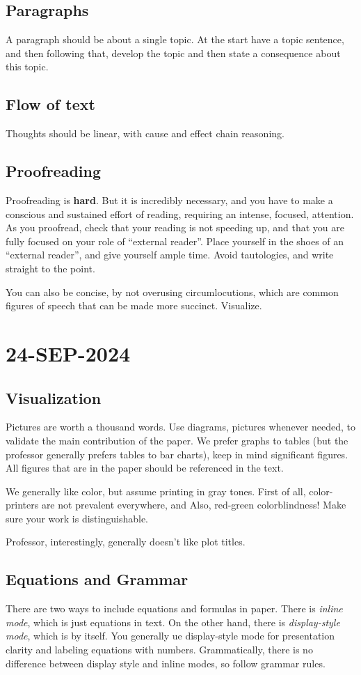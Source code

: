 \documentclass[10pt, oneside]{article}
\begin{document}
\subsection{Paragraphs}
A paragraph should be about a single topic. At the start have a topic sentence, and then following that, develop the topic and then state a consequence about this topic. 
\subsection{Flow of text}
Thoughts should be linear, with cause and effect chain reasoning. 
\subsection{Proofreading}
Proofreading is \textbf{hard}. But it is incredibly necessary, and you have to make a conscious and sustained effort of reading, requiring an intense, focused, attention. As you proofread, check that your reading is not speeding up, and that you are fully focused on your role of ``external reader''. Place yourself in the shoes of an ``external reader'', and give yourself ample time.
Avoid tautologies, and write straight to the point. 

You can also be concise, by not overusing circumlocutions, which are common figures of speech that can be made more succinct. Visualize. 

\section{24-SEP-2024}
\subsection{Visualization}
Pictures are worth a thousand words. Use diagrams, pictures whenever needed, to validate the main contribution of the paper. We prefer graphs to tables (but the professor generally prefers tables to bar charts), keep in mind significant figures. All figures that are in the paper should be referenced in the text.  

We generally like color, but assume printing in gray tones. First of all, color-printers are not prevalent everywhere, and Also, red-green colorblindness! Make sure your work is distinguishable. 

Professor, interestingly, generally doesn't like plot titles. 
\subsection{Equations and Grammar}
There are two ways to include equations and formulas in paper. There is \textit{inline mode}, which is just equations in text. On the other hand, there is \textit{display-style mode}, which is by itself. You generally ue display-style mode for presentation clarity and labeling equations with numbers. Grammatically, there is no difference between display style and inline modes, so follow grammar rules. 
\end{document}
